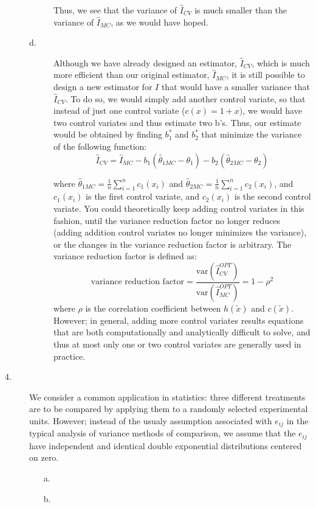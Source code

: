 \documentclass[12pt]{article}
\begin{document}
\begin{description}
\begin{description}
Thus, we see that the variance of $\hat{I}_{CV}$ is much smaller than the variance of $\hat{I}_{MC}$, as we would have hoped.  
\item[d.] Although we have already designed an estimator, $\hat{I}_{CV}$, which is much more efficient than our original estimator, $\hat{I}_{MC}$, it is still possible to design a new estimator for $I$ that would have a smaller variance that $\hat{I}_{CV}$. To do so, we would simply add another control variate, so that instead of just one control variate ($c(x) = 1 + x)$, we would have two control variates and thus estimate two b's. Thus, our estimate would be obtained by finding $b_1^*$ and $b_2^*$ that minimize the variance of the following function:
\[\hat{I}_{CV} = \hat{I}_{MC} - b_1(\hat{\theta}_{1MC} - \theta_1) - b_2(\hat{\theta}_{2MC} - \theta_2)\]

where $\hat{\theta}_{1MC} = \frac{1}{n} \sum_{i = 1}^n c_1(x_i)$ and $\hat{\theta}_{2MC} = \frac{1}{n} \sum_{i = 1}^n c_2(x_i)$, and $c_1(x_i)$ is the first control variate, and $c_2(x_i)$ is the second control variate. You could theoretically keep adding control variates in this fashion, until the variance reduction factor no longer reduces (adding addition control variates no longer minimizes the variance), or the changes in the variance reduction factor is arbitrary. The variance reduction factor is defined as:
\[\text{variance reduction factor} = \frac{\mathrm{var} (\hat{I}_{CV}^{OPT})}{\mathrm{var}(\hat{I}_{MC}^{OPT})} = 1 - \rho^2\]
where $\rho$ is the correlation coefficient between $h(\tilde{x})$ and $c(\tilde{x})$. However; in general, adding more control variates results equations that are both computationally and analytically difficult to solve, and thus at most only one or two control variates are generally used in practice.  
\end{description}



\item[4.] We consider a common application in statistics: three different treatments are to be compared by applying them to a randomly selected experimental units. However; instead of the usualy assumption associated with $e_{ij}$ in the typical analysis of variance methods of comparison, we assume that the $e_{ij}$  have independent and identical double exponential distributions centered on zero.
\begin{itemize}
\item[a.]
\item[b.]
\end{itemize}



\end{description}
\end{document}
